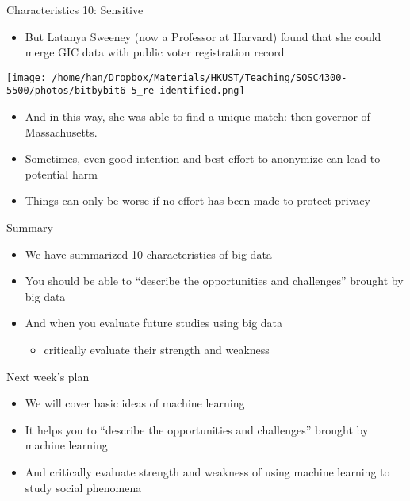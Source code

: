 \documentclass[handout]{beamer}
\begin{document}
\begin{frame}[label={h:9cf3086e-02e2-4ad1-a510-2380d6f7ff5e}]{Characteristics 10: Sensitive}
\begin{itemize}
\item But Latanya Sweeney (now a Professor at Harvard) found that she could merge GIC data with public voter registration record
\end{itemize}

\begin{center}
\texttt{[image: /home/han/Dropbox/Materials/HKUST/Teaching/SOSC4300-5500/photos/bitbybit6-5\_re-identified.png]}
\end{center}

\begin{itemize}
\item And in this way, she was able to find a unique match: then governor of Massachusetts.
\item Sometimes, even good intention and best effort to anonymize can lead to potential harm
\item Things can only be worse if no effort has been made to protect privacy
\end{itemize}
\end{frame}
\begin{frame}[label={h:439e90ee-3c98-42e2-a992-e5311c305341}]{Summary}
\begin{itemize}
\item We have summarized 10 characteristics of big data
\item You should be able to ``describe the opportunities and challenges'' brought by big data
\item And when you evaluate future studies using big data
\begin{itemize}
\item \alert{critically} evaluate their strength and weakness
\end{itemize}
\end{itemize}
\end{frame}

\begin{frame}[label={h:218f839a-12eb-49e9-b1eb-3a8a990a42a6}]{Next week's plan}
\begin{itemize}
\item We will cover basic ideas of machine learning
\item It helps you to ``describe the opportunities and challenges'' brought by machine learning
\item And \alert{critically} evaluate strength and weakness of using machine learning to study social phenomena
\end{itemize}
\end{frame}
\end{document}
